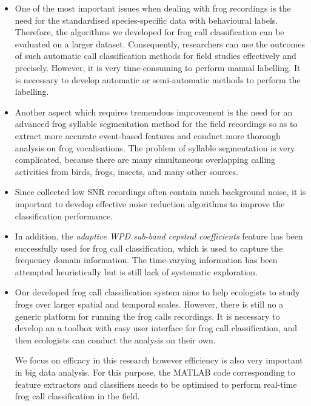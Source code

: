 \begin{itemize}
\item  One of the most important issues when dealing with frog recordings is the need for the standardised species-specific data with behavioural labels. 
Therefore, the algorithms we developed for frog call classification can be evaluated on a larger dataset. Consequently, researchers can use the outcomes of such automatic call classification methods for field studies effectively and precisely. However, it is very time-consuming to perform manual labelling. It is necessary to develop automatic or semi-automatic methods to perform the labelling.

\item  Another aspect which requires tremendous improvement is the need for an advanced frog syllable segmentation method for the field recordings so as to extract more accurate event-based features and conduct more thorough analysis on frog vocalisations. The problem of syllable segmentation is very complicated, because there are many simultaneous overlapping calling activities from birds, frogs, insects, and many other sources. 

\item Since collected low SNR recordings often contain much background noise, it is important to develop effective noise reduction algorithms to improve the classification performance.



\item In addition, the \textit{adaptive WPD sub-band cepstral coefficients} feature has been successfully used for frog call classification, which is used to capture the frequency domain information. The time-varying information has been attempted heuristically but is still lack of systematic exploration. 




\item Our developed frog call classification system aims to help ecologists to study frogs over larger spatial and temporal scales. However, there is still no a generic platform for running the frog calls recordings. It is necessary to develop an a toolbox with easy user interface for frog call classification, and then ecologists can conduct the analysis on their own. 


We focus on efficacy in this research however efficiency is also very important in big data analysis. For this purpose, the MATLAB code corresponding to feature extractors and classifiers needs to be optimised to perform real-time frog call classification in the field.


\end{itemize}










